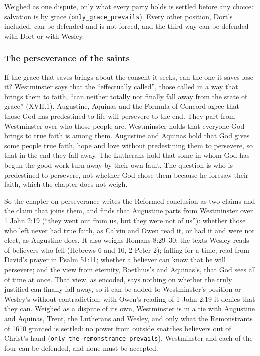 \documentclass[11pt]{article}
\begin{document}
Weighed as one dispute, only what every party holds is settled before any choice: salvation is by grace (\texttt{only\_\allowbreak{}grace\_\allowbreak{}prevails}). Every other position, Dort’s included, can be defended and is not forced, and the third way can be defended with Dort or with Wesley.

\subsubsection*{The perseverance of the saints}
If the grace that saves brings about the consent it seeks, can the one it saves lose it? Westminster says that the “effectually called”, those called in a way that brings them to faith, “can neither totally nor finally fall away from the state of grace” (XVII.1). Augustine, Aquinas and the Formula of Concord agree that those God has predestined to life will persevere to the end. They part from Westminster over who those people are. Westminster holds that everyone God brings to true faith is among them. Augustine and Aquinas hold that God gives some people true faith, hope and love without predestining them to persevere, so that in the end they fall away. The Lutherans hold that some in whom God has begun the good work turn away by their own fault. The question is who is predestined to persevere, not whether God chose them because he foresaw their faith, which the chapter does not weigh.

So the chapter on perseverance writes the Reformed conclusion as two claims and the claim that joins them, and finds that Augustine parts from Westminster over 1 John 2:19 (“they went out from us, but they were not of us”): whether those who left never had true faith, as Calvin and Owen read it, or had it and were not elect, as Augustine does. It also weighs Romans 8:29–30; the texts Wesley reads of believers who fell (Hebrews 6 and 10, 2 Peter 2); falling for a time, read from David’s prayer in Psalm 51:11; whether a believer can know that he will persevere; and the view from eternity, Boethius’s and Aquinas’s, that God sees all of time at once. That view, as encoded, says nothing on whether the truly justified can finally fall away, so it can be added to Westminster’s position or Wesley’s without contradiction; with Owen’s reading of 1 John 2:19 it denies that they can. Weighed as a dispute of its own, Westminster is in a tie with Augustine and Aquinas, Trent, the Lutherans and Wesley, and only what the Remonstrants of 1610 granted is settled: no power from outside snatches believers out of Christ’s hand (\texttt{only\_\allowbreak{}the\_\allowbreak{}remonstrance\_\allowbreak{}prevails}). Westminster and each of the four can be defended, and none must be accepted.
\end{document}
